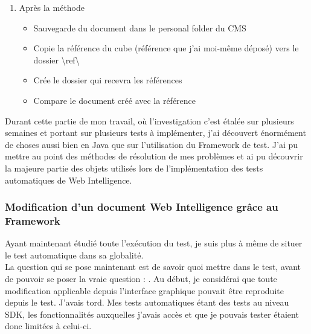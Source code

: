 \begin{enumerate}
\begin{itemize}
	\end{itemize}
	\item Apr\`{e}s la m\'{e}thode 
	\begin{itemize}
		\item Sauvegarde du document dans le personal folder du \gls{CMS}
		\item Copie la r\'{e}f\'{e}rence du cube (r\'{e}f\'{e}rence que j'ai moi-m\^{e}me d\'{e}pos\'{e}) vers le dossier \textbackslash ref\textbackslash
		\item Cr\'{e}e le dossier qui recevra les r\'{e}f\'{e}rences
		\item Compare le document cr\'{e}\'{e} avec la r\'{e}f\'{e}rence
	\end{itemize}
\end{enumerate}

Durant cette partie de mon travail, o\`{u} l'investigation c'est \'{e}tal\'{e}e sur plusieurs semaines et portant sur plusieurs tests \`{a} impl\'{e}menter, j'ai d\'{e}couvert \'{e}norm\'{e}ment de choses aussi bien en \gls{Java} que sur l'utilisation du \gls{Framework} de test. J'ai pu mettre au point des m\'{e}thodes de r\'{e}solution de mes probl\`{e}mes et ai pu d\'{e}couvrir la majeure partie des objets utilis\'{e}s lors de l'impl\'{e}mentation des tests automatiques de Web Intelligence.


\subsubsection{Modification d'un document Web Intelligence gr\^{a}ce au \gls{Framework}}

Ayant maintenant \'{e}tudi\'{e} toute l'ex\'{e}cution du test, je suis plus \`{a} m\^{e}me de situer le test automatique dans sa globalit\'{e}.\\
La question qui se pose maintenant est de savoir quoi mettre dans le test, avant de pouvoir se poser la vraie question : . Au d\'{e}but, je consid\'{e}rai que toute modification applicable depuis l'interface graphique pouvait \^{e}tre reproduite depuis le test. J'avais tord. Mes tests automatiques \'{e}tant des tests au niveau SDK, les fonctionnalit\'{e}s auxquelles j'avais acc\`{e}s et que je pouvais tester \'{e}taient donc limit\'{e}es \`{a} celui-ci.\\

